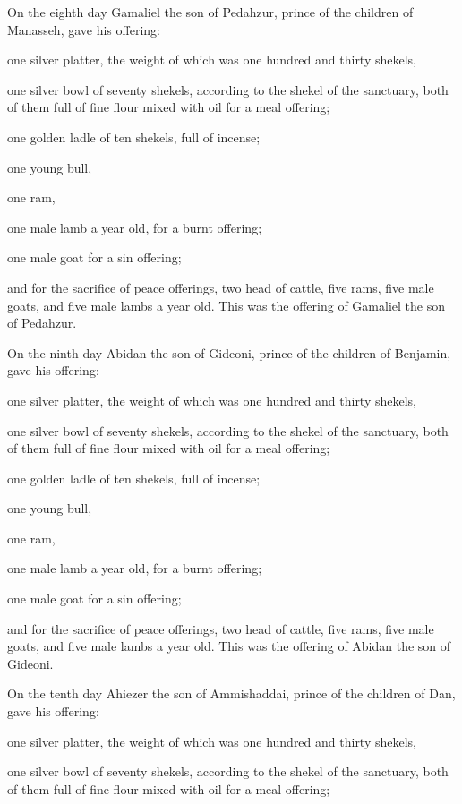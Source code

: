  On the eighth day Gamaliel the son of Pedahzur, prince
of the children of Manasseh,  gave his offering:

one silver platter, the weight of which was one hundred and thirty
shekels,

one silver bowl of seventy shekels, according to the shekel of the
sanctuary, both of them full of fine flour mixed with oil for a meal
offering;

 one golden ladle of ten shekels, full of incense;

 one young bull,

one ram,

one male lamb a year old, for a burnt offering;

 one male goat for a sin offering;

 and for the sacrifice of peace offerings, two head of
cattle, five rams, five male goats, and five male lambs a year old. This
was the offering of Gamaliel the son of Pedahzur.

 On the ninth day Abidan the son of Gideoni, prince of
the children of Benjamin,  gave his offering:

one silver platter, the weight of which was one hundred and thirty
shekels,

one silver bowl of seventy shekels, according to the shekel of the
sanctuary, both of them full of fine flour mixed with oil for a meal
offering;

 one golden ladle of ten shekels, full of incense;

 one young bull,

one ram,

one male lamb a year old, for a burnt offering;

 one male goat for a sin offering;

 and for the sacrifice of peace offerings, two head of
cattle, five rams, five male goats, and five male lambs a year old. This
was the offering of Abidan the son of Gideoni.

 On the tenth day Ahiezer the son of Ammishaddai, prince
of the children of Dan,  gave his offering:

one silver platter, the weight of which was one hundred and thirty
shekels,

one silver bowl of seventy shekels, according to the shekel of the
sanctuary, both of them full of fine flour mixed with oil for a meal
offering;

